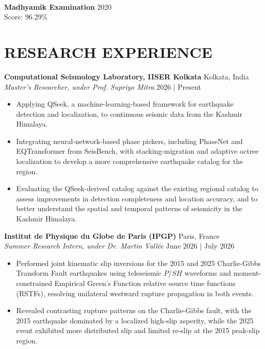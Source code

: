 \documentclass[a4paper,9pt]{extarticle}
\begin{document}
\noindent\\
\textbf{Madhyamik Examination} \hfill 2020\\
Score: 96.29\%

\section*{RESEARCH EXPERIENCE}
\noindent
\textbf{Computational Seismology Laboratory, IISER Kolkata} \hfill Kolkata, India\\
\textit{Master's Researcher, under Prof. Supriyo Mitra} \hfill 2026 | Present
\begin{itemize}

    \item Applying QSeek, a machine-learning-based framework for earthquake detection and localization, to continuous seismic data from the Kashmir Himalaya.

    \item Integrating neural-network-based phase pickers, including PhaseNet and EQTransformer from SeisBench, with stacking-migration and adaptive octree localization to develop a more comprehensive earthquake catalog for the region.

    \item Evaluating the QSeek-derived catalog against the existing regional catalog to assess improvements in detection completeness and location accuracy, and to better understand the spatial and temporal patterns of seismicity in the Kashmir Himalaya.

\end{itemize}
\noindent
\textbf{Institut de Physique du Globe de Paris (IPGP)} \hfill Paris, France\\
\textit{Summer Research Intern, under Dr. Martin Vall\'ee} \hfill June 2026 | July 2026
\begin{itemize}
    \item Performed joint kinematic slip inversions for the 2015 and 2025 Charlie-Gibbs Transform Fault earthquakes using teleseismic $P$/$SH$ waveforms and moment-constrained Empirical Green's Function relative source time functions (RSTFs), resolving unilateral westward rupture propagation in both events.
    \item Revealed contrasting rupture patterns on the Charlie-Gibbs fault, with the 2015 earthquake dominated by a localized high-slip asperity, while the 2025 event exhibited more distributed slip and limited re-slip at the 2015 peak-slip region.
\end{itemize}
\end{document}
